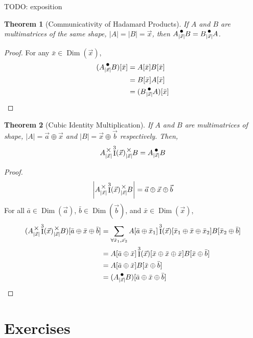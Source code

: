 \documentclass[12pt]{book}
\theoremstyle{plain}
\newtheorem{theorem}{Theorem}[chapter]
\theoremstyle{definition}
\theoremstyle{ppart}
\theoremstyle{case}
\theoremstyle{solution}
\DeclareMathOperator{\Dim}{Dim}
\DeclareMathOperator{\Ident}{I}
\newcommand{\mmult}[1]{\text{\raisebox{1ex}{$\underset{#1}{\times}$}}}
\newcommand{\dmult}[1]{\text{\raisebox{1ex}{$\underset{#1}{\,\bullet\,}$}}}
\newcommand{\shape}[1]{\left|#1\right|}
\begin{document}
TODO: exposition

\begin{theorem}[Communicativity of Hadamard Products]
If $A$ and $B$ are multimatrices of the same shape, $\shape{A} = \shape{B} = \vec{x}$,
then $A \dmult{\shape{\vec{x}}} B = B \dmult{\shape{\vec{x}}} A$.
\end{theorem}
\begin{proof}
For any $\bar{x} \in \Dim(\vec{x})$,
\begin{align*}
(A \dmult{\shape{\vec{x}}} B)[\bar{x}]
  &= A[\bar{x}] B[\bar{x}] \\
  &= B[\bar{x}] A[\bar{x}] \\
  &= (B \dmult{\shape{\vec{x}}} A)[\bar{x}]
\end{align*}
\end{proof}

\begin{theorem}[Cubic Identity Multiplication]
\label{hada_cubic}
If $A$ and $B$ are multimatrices of shape, $\shape{A} = \vec{a} \oplus \vec{x}$
and $\shape{B} = \vec{x} \oplus \vec{b}$ respectively. Then,
\[ A \mmult{\shape{\vec{x}}} \Ident^3(\vec{x}) \mmult{\shape{\vec{x}}} B = A \dmult{\shape{\vec{x}}} B \]
\end{theorem}
\begin{proof}
\[ \shape{A \mmult{\shape{\vec{x}}} \Ident^3(\vec{x}) \mmult{\shape{\vec{x}}} B} = \vec{a} \oplus \vec{x} \oplus \vec{b}  \]
For all $\bar{a} \in \Dim(\vec{a})$, $\bar{b} \in \Dim(\vec{b})$, and $\bar{x} \in \Dim(\vec{x})$, 
\begin{align*}
  (A \mmult{\shape{\vec{x}}} \Ident^3(\vec{x}) \mmult{\shape{\vec{x}}} B)[\bar{a} \oplus \bar{x} \oplus \bar{b}]
  &= \sum_{\forall \bar{x}_1, \bar{x_2}} A[\bar{a} \oplus \bar{x}_1] \Ident^3(\vec{x})[\bar{x}_1 \oplus \bar{x} \oplus \bar{x}_2] B[\bar{x}_2 \oplus \bar{b}] \\
  &= A[\bar{a} \oplus \bar{x}] \Ident^3(\vec{x})[\bar{x} \oplus \bar{x} \oplus \bar{x}] B[\bar{x} \oplus \bar{b}] \\
  &= A[\bar{a} \oplus \bar{x}] B[\bar{x} \oplus \bar{b}] \\
  &= (A \dmult{\shape{\vec{x}}} B) [\bar{a} \oplus \bar{x} \oplus \bar{b}]
\end{align*}
\end{proof}

\section{Exercises}
\end{document}
